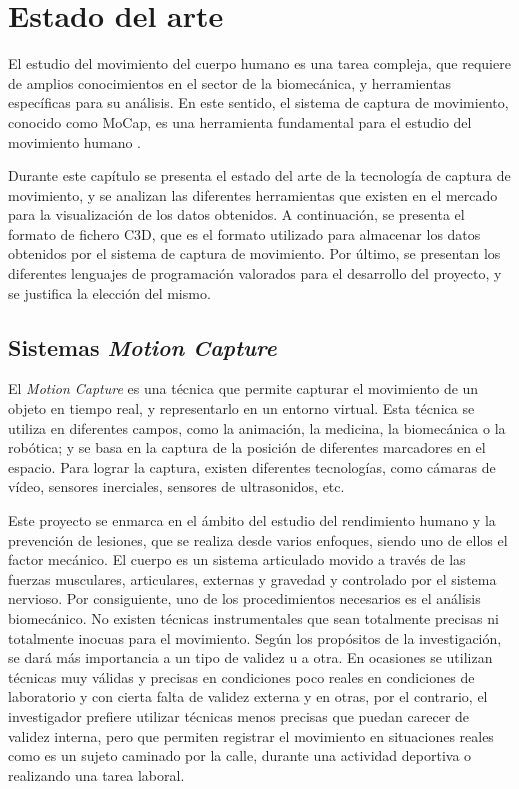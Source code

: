 \chapter{Estado del arte} \label{sec:cap2}

\noindent El estudio del movimiento del cuerpo humano es una tarea compleja, que requiere de amplios conocimientos en el sector de la biomecánica, y herramientas específicas para su análisis. En este sentido, el sistema de captura de movimiento, conocido como \ac{MoCap}, es una herramienta fundamental para el estudio del movimiento humano \autocite{taiQueEsMotion2024}.

Durante este capítulo se presenta el estado del arte de la tecnología de captura de movimiento, y se analizan las diferentes herramientas que existen en el mercado para la visualización de los datos obtenidos. A continuación, se presenta el formato de fichero \ac{C3D}, que es el formato utilizado para almacenar los datos obtenidos por el sistema de captura de movimiento. Por último, se presentan los diferentes lenguajes de programación valorados para el desarrollo del proyecto, y se justifica la elección del mismo.

\section{Sistemas \textit{Motion Capture}}
El \textit{Motion Capture} es una técnica que permite capturar el movimiento de un objeto en tiempo real, y representarlo en un entorno virtual. Esta técnica se utiliza en diferentes campos, como la animación, la medicina, la biomecánica o la robótica; y se basa en la captura de la posición de diferentes marcadores en el espacio. Para lograr la captura, existen diferentes tecnologías, como cámaras de vídeo, sensores inerciales, sensores de ultrasonidos, etc. \autocite{taiQueEsMotion2024}

Este proyecto se enmarca en el ámbito del estudio del rendimiento humano y la prevención de lesiones, que se realiza desde varios enfoques, siendo uno de ellos el factor mecánico. El cuerpo es un sistema articulado movido a través de las fuerzas musculares, articulares, externas y gravedad y controlado por el sistema nervioso. Por consiguiente, uno de los procedimientos necesarios es el análisis biomecánico. No existen técnicas instrumentales que sean totalmente precisas ni totalmente inocuas para el movimiento. Según los propósitos de la investigación, se dará más importancia a un tipo de validez u a otra. En ocasiones se utilizan técnicas muy válidas y precisas en condiciones poco reales en condiciones de laboratorio y con cierta falta de validez externa y en otras, por el contrario, el investigador prefiere utilizar técnicas menos precisas que puedan carecer de validez interna, pero que permiten registrar el movimiento en situaciones reales como es un sujeto caminado por la calle, durante una actividad deportiva o realizando una tarea laboral.

